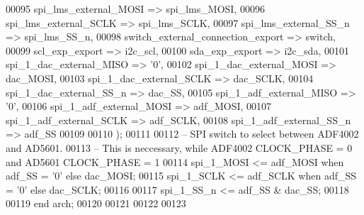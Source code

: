 \begin{DoxyCode}
00095          spi_lms_external_MOSI                   => spi_lms_MOSI,
00096          spi_lms_external_SCLK                   => spi_lms_SCLK,
00097          spi_lms_external_SS_n                   => spi_lms_SS_n,
00098          switch_external_connection_export       => switch,
00099          scl_exp_export                          => i2c_scl,
00100          sda_exp_export                          => i2c_sda,
00101          spi_1_dac_external_MISO                 => '0',
00102          spi_1_dac_external_MOSI                 => dac_MOSI,
00103          spi_1_dac_external_SCLK                 => dac_SCLK,
00104          spi_1_dac_external_SS_n                 => dac_SS,
00105          spi_1_adf_external_MISO                 => '0',
00106          spi_1_adf_external_MOSI                 => adf_MOSI,
00107          spi_1_adf_external_SCLK                 => adf_SCLK,
00108          spi_1_adf_external_SS_n                 => adf_SS
00109 
00110       \textcolor{vhdlchar}{)};
00111       
00112 \textcolor{keyword}{      -- SPI switch to select between ADF4002 and AD5601.}
00113 \textcolor{keyword}{      -- This is neccessary, while ADF4002 CLOCK\_PHASE = 0 and AD5601 CLOCK\_PHASE = 1}
00114       \textcolor{vhdlchar}{spi_1_MOSI} \textcolor{vhdlchar}{<=} \textcolor{vhdlchar}{adf_MOSI} \textcolor{keywordflow}{when} \textcolor{vhdlchar}{adf_SS} \textcolor{vhdlchar}{=} \textcolor{vhdlchar}{'}\textcolor{vhdllogic}{}\textcolor{vhdllogic}{0}\textcolor{vhdlchar}{'} \textcolor{keywordflow}{else} \textcolor{vhdlchar}{dac_MOSI};
00115       \textcolor{vhdlchar}{spi_1_SCLK} \textcolor{vhdlchar}{<=} \textcolor{vhdlchar}{adf_SCLK} \textcolor{keywordflow}{when} \textcolor{vhdlchar}{adf_SS} \textcolor{vhdlchar}{=} \textcolor{vhdlchar}{'}\textcolor{vhdllogic}{}\textcolor{vhdllogic}{0}\textcolor{vhdlchar}{'} \textcolor{keywordflow}{else} \textcolor{vhdlchar}{dac_SCLK};
00116       
00117       \textcolor{vhdlchar}{spi_1_SS_n} \textcolor{vhdlchar}{<=} \textcolor{vhdlchar}{adf_SS} \textcolor{vhdlchar}{&} \textcolor{vhdlchar}{dac_SS};
00118 
00119 \textcolor{keywordflow}{end} \textcolor{vhdlchar}{arch};   
00120 
00121 
00122 
00123 
\end{DoxyCode}
